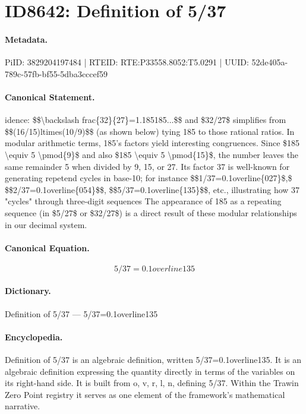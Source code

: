 \section*{ID8642: Definition of 5/37}
\paragraph{Metadata.}
PiID: 3829204197484 | RTEID: RTE:P33558.8052:T5.0291 | UUID: 52de405a-789c-57fb-bf55-5dba3cccef59

\paragraph{Canonical Statement.}
idence: \$\$\textbackslash{}backslash frac\{32\}\{27\}=1.185185...\$\$ and \$32/27\$ simplifies from \$\$(16/15)ltimes(10/9)\$\$ (as shown below) tying 185 to those rational ratios. In modular arithmetic terms, 185's factors yield interesting congruences. Since \$185 \textbackslash{}equiv 5 \textbackslash{}pmod\{9\}\$ and also \$185 \textbackslash{}equiv 5 \textbackslash{}pmod\{15\}\$, the number leaves the same remainder 5 when divided by 9, 15, or 27. Its factor 37 is well-known for generating repetend cycles in base-10; for instance \$\$1/37=0.1overline\{027\}\$,\$ \$\$2/37=0.1overline\{054\}\$\$, \$\$5/37=0.1overline\{135\}\$\$, etc., illustrating how 37 "cycles" through three-digit sequences The appearance of 185 as a repeating sequence (in \$5/27\$ or \$32/27\$) is a direct result of these modular relationships in our decimal system.

\paragraph{Canonical Equation.}
\[
5/37=0.1overline{135}
\]

\paragraph{Dictionary.}
Definition of 5/37 — 5/37=0.1overline135

\paragraph{Encyclopedia.}
Definition of 5/37 is an algebraic definition, written 5/37=0.1overline135. It is an algebraic definition expressing the quantity directly in terms of the variables on its right-hand side. It is built from o, v, r, l, n, defining 5/37. Within the Trawin Zero Point registry it serves as one element of the framework's mathematical narrative.

